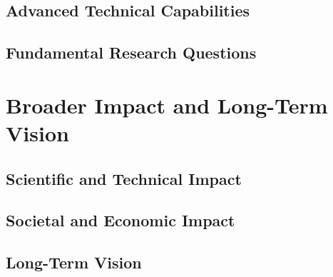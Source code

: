 \subsection{Advanced Technical Capabilities}

\subsection{Fundamental Research Questions}

\section{Broader Impact and Long-Term Vision}

\subsection{Scientific and Technical Impact}

\subsection{Societal and Economic Impact}

\subsection{Long-Term Vision}

